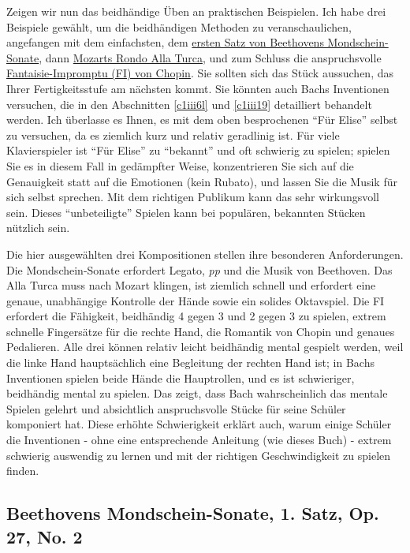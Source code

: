 Zeigen wir nun das beidhändige Üben an praktischen Beispielen.
Ich habe drei Beispiele gewählt, um die beidhändigen Methoden zu veranschaulichen, angefangen mit dem einfachsten, dem \hyperref[c1ii25b]{ersten Satz von Beethovens Mondschein-Sonate}, dann \hyperref[c1ii25c]{Mozarts Rondo Alla Turca}, und zum Schluss die anspruchsvolle \hyperref[c1ii25d]{Fantaisie-Impromptu (FI) von Chopin}.
Sie sollten sich das Stück aussuchen, das Ihrer Fertigkeitsstufe am nächsten kommt.
Sie könnten auch Bachs Inventionen versuchen, die in den Abschnitten \hyperref[c1iii6l]{\ref*{c1iii6l}} und \hyperref[c1iii19]{\ref*{c1iii19}} detailliert behandelt werden.
Ich überlasse es Ihnen, es mit dem oben besprochenen \enquote{Für Elise} selbst zu versuchen, da es ziemlich kurz und relativ geradlinig ist.
Für viele Klavierspieler ist \enquote{Für Elise} zu \enquote{bekannt} und oft schwierig zu spielen; spielen Sie es in diesem Fall in gedämpfter Weise, konzentrieren Sie sich auf die Genauigkeit statt auf die Emotionen (kein Rubato), und lassen Sie die Musik für sich selbst sprechen.
Mit dem richtigen Publikum kann das sehr wirkungsvoll sein.
Dieses \enquote{unbeteiligte} Spielen kann bei populären, bekannten Stücken nützlich sein.

Die hier ausgewählten drei Kompositionen stellen ihre besonderen Anforderungen.
Die Mondschein-Sonate erfordert Legato, \textit{pp} und die Musik von Beethoven.
Das Alla Turca muss nach Mozart klingen, ist ziemlich schnell und erfordert eine genaue, unabhängige Kontrolle der Hände sowie ein solides Oktavspiel.
Die FI erfordert die Fähigkeit, beidhändig 4 gegen 3 und 2 gegen 3 zu spielen, extrem schnelle Fingersätze für die rechte Hand, die Romantik von Chopin und genaues Pedalieren.
Alle drei können relativ leicht beidhändig mental gespielt werden, weil die linke Hand hauptsächlich eine Begleitung der rechten Hand ist; in Bachs Inventionen spielen beide Hände die Hauptrollen, und es ist schwieriger, beidhändig mental zu spielen.
Das zeigt, dass Bach wahrscheinlich das mentale Spielen gelehrt und absichtlich anspruchsvolle Stücke für seine Schüler komponiert hat.
Diese erhöhte Schwierigkeit erklärt auch, warum einige Schüler die Inventionen - ohne eine entsprechende Anleitung (wie dieses Buch) - extrem schwierig auswendig zu lernen und mit der richtigen Geschwindigkeit zu spielen finden.


\subsection{Beethovens Mondschein-Sonate, 1. Satz, Op. 27, No. 2}
\label{c1ii25b}

